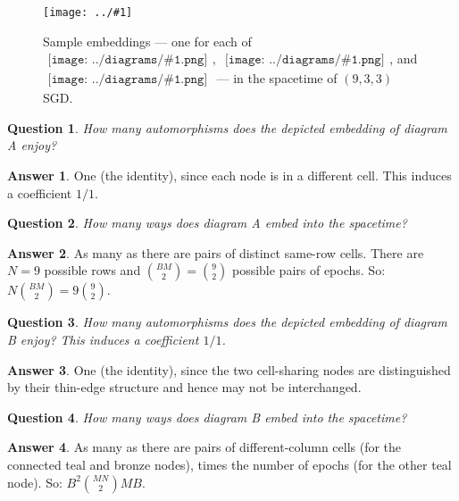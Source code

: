 \documentclass{article}
\theoremstyle{plain}
\newtheorem*{quest*}{Question}
\theoremstyle{definition}
\newtheorem*{answ*}{Answer}
\newcommand{\plotmoo}[3]{
    \texttt{[image: ../\#1]}
}
\newcommand{\sdia}[1]{\begin{gathered}\texttt{[image: ../diagrams/\#1.png]}\end{gathered}}
\begin{document}
            \begin{figure}[h!]
                \centering  
                \plotmoo{diagrams/spacetime-i}{\columnwidth}{}
                \caption{
                    Sample embeddings --- one for each of
                    $\sdia{(01-2)(01-12)}$,
                    $\sdia{(01-2-3)(03-12-23)}$, and
                    $\sdia{(01-2-3)(03-13-23)}$ ---
                    in the spacetime of $(9,3,3)$ SGD.
                }
                \label{fig:practicespacetime}
            \end{figure}

            \begin{quest*}
                How many automorphisms does the depicted embedding of diagram A
                enjoy?
            \end{quest*}
            \begin{answ*}
                One (the identity), since each node is in a different cell.
                This induces a coefficient $1/1$.
            \end{answ*}
            \begin{quest*}
                How many ways does diagram A embed into the spacetime?
            \end{quest*}
            \begin{answ*}
                As many as there are pairs of distinct same-row cells.  There
                are $N=9$ possible rows and ${BM\choose 2} = {9\choose 2}$
                possible pairs of epochs.  So: $N{BM\choose 2} = 9 {9\choose
                2}$.
            \end{answ*}

            \begin{quest*}
                How many automorphisms does the depicted embedding of diagram B
                enjoy?
                This induces a coefficient $1/1$.
            \end{quest*}
            \begin{answ*}
                One (the identity), since the two cell-sharing nodes are
                distinguished by their thin-edge structure and hence may not be
                interchanged.
            \end{answ*}
            \begin{quest*}
                How many ways does diagram B embed into the spacetime?
            \end{quest*}
            \begin{answ*}
                As many as there are pairs of different-column cells 
                (for the connected teal and bronze nodes), times the number
                of epochs (for the other teal node).  
                So: $B^2{MN \choose 2}MB$.
            \end{answ*}
\end{document}
